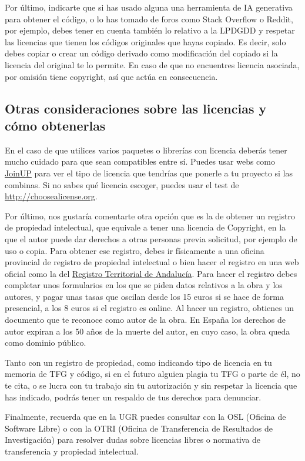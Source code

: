 Por último, indicarte que si has usado alguna una herramienta de IA generativa para obtener el código, o lo has tomado de foros como Stack Overflow o Reddit, por ejemplo, debes tener en cuenta también lo relativo a la LPDGDD y respetar las licencias que tienen los códigos originales que hayas copiado. Es decir, solo debes copiar o crear un código derivado como modificación del copiado si la licencia del original te lo permite. En caso de que no encuentres licencia asociada, por omisión tiene copyright, así que actúa en consecuencia.


\subsection{Otras consideraciones sobre las licencias y cómo obtenerlas}

En el caso de que utilices varios paquetes o librerías con licencia deberás tener mucho cuidado para que sean compatibles entre sí. Puedes usar webs como \href{https://joinup.ec.europa.eu/collection/eupl/soluti on/joinup-licensing-assistant/jla-compatibility-ch ecker}{JoinUP} para ver el tipo de licencia que tendrías que ponerle a tu proyecto si las combinas. Si no sabes qué licencia escoger, puedes usar el test de \url{http://choosealicense.org}.

Por último, nos gustaría comentarte otra opción que es la de obtener un registro de propiedad intelectual, que equivale a tener una licencia de Copyright, en la que el autor puede dar derechos a otras personas previa solicitud, por ejemplo de uso o copia. Para obtener ese registro, debes ir físicamente a una oficina provincial de registro de propiedad intelectual o bien hacer el registro en una web oficial como la del \href{https://www.juntadeandalucia.es/organismos/turismoculturaydeporte/servicios/procedimientos/detalle/297.html}{Registro Territorial de Andalucía}. Para hacer el registro debes completar unos formularios en los que se piden datos relativos a la obra y los autores, y pagar unas tasas que oscilan desde los 15 euros si se hace de forma presencial, a los 8 euros si el registro es online. Al hacer un registro, obtienes un documento que te reconoce como autor de la obra. En España los derechos de autor expiran a los 50 años de la muerte del autor, en cuyo caso, la obra queda como dominio público.

Tanto con un registro de propiedad, como indicando tipo de licencia en tu memoria de TFG y código, si en el futuro alguien plagia tu TFG o parte de él, no te cita, o se lucra con tu trabajo sin tu autorización y sin respetar la licencia que has indicado, podrás tener un respaldo de tus derechos para denunciar.

Finalmente, recuerda que en la UGR puedes consultar con la OSL (Oficina de Software Libre) o con la OTRI (Oficina de Transferencia de Resultados de Investigación) para resolver dudas sobre licencias libres o normativa de transferencia y propiedad intelectual.

